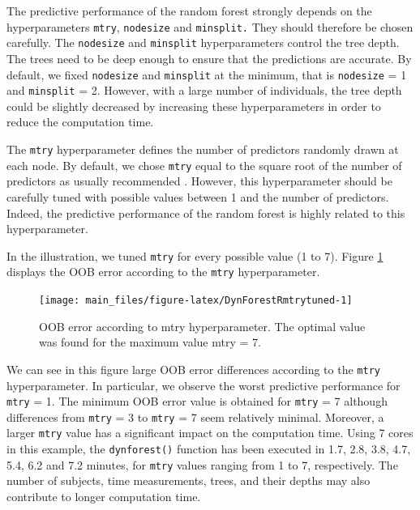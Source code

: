 The predictive performance of the random forest strongly depends on the hyperparameters \texttt{mtry}, \texttt{nodesize} and \texttt{minsplit.} They should therefore be chosen carefully. The \texttt{nodesize} and \texttt{minsplit} hyperparameters control the tree depth. The trees need to be deep enough to ensure that the predictions are accurate. By default, we fixed \texttt{nodesize} and \texttt{minsplit} at the minimum, that is \texttt{nodesize} = 1 and \texttt{minsplit} = 2. However, with a large number of individuals, the tree depth could be slightly decreased by increasing these hyperparameters in order to reduce the computation time.

The \texttt{mtry} hyperparameter defines the number of predictors randomly drawn at each node. By default, we chose \texttt{mtry} equal to the square root of the number of predictors as usually recommended \citep{bernard_influence_2009}. However, this hyperparameter should be carefully tuned with possible values between 1 and the number of predictors. Indeed, the predictive performance of the random forest is highly related to this hyperparameter.

In the illustration, we tuned \texttt{mtry} for every possible value (1 to 7). Figure \ref{fig:DynForestRmtrytuned} displays the OOB error according to the \texttt{mtry} hyperparameter.

\begin{figure}

{\centering \texttt{[image: main\_files/figure-latex/DynForestRmtrytuned-1]}

}

\caption{OOB error according to mtry hyperparameter. The optimal value was found for the maximum value mtry = 7.}\label{fig:DynForestRmtrytuned}
\end{figure}

We can see in this figure large OOB error differences according to the \texttt{mtry} hyperparameter. In particular, we observe the worst predictive performance for \texttt{mtry} = 1. The minimum OOB error value is obtained for \texttt{mtry} = 7 although differences from \texttt{mtry} = 3 to \texttt{mtry} = 7 seem relatively minimal. Moreover, a larger \texttt{mtry} value has a significant impact on the computation time. Using 7 cores in this example, the \texttt{dynforest()} function has been executed in 1.7, 2.8, 3.8, 4.7, 5.4, 6.2 and 7.2 minutes, for \texttt{mtry} values ranging from 1 to 7, respectively. The number of subjects, time measurements, trees, and their depths may also contribute to longer computation time.

